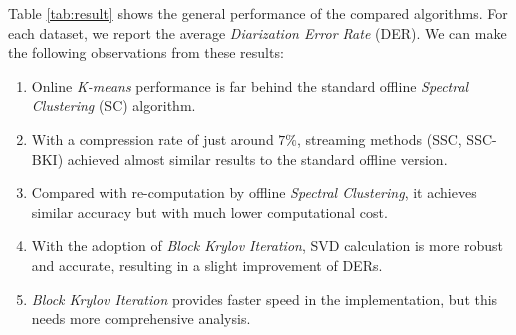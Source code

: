 Table \ref{tab:result} shows the general performance of the compared algorithms. For each dataset, we report the average \textit{Diarization Error Rate} (DER). We can make the following observations from these results:
\begin{enumerate}
    \item Online \textit{K-means} performance is far behind the standard offline \textit{Spectral Clustering} (SC) algorithm.
    \item With a compression rate of just around $7\%$, streaming methods (SSC, SSC-BKI) achieved almost similar results to the standard offline version.
    \item Compared with re-computation by offline \textit{Spectral Clustering}, it achieves similar accuracy but with much lower computational cost.
    \item With the adoption of \textit{Block Krylov Iteration}, SVD calculation is more robust and accurate, resulting in a slight improvement of DERs.
    \item \textit{Block Krylov Iteration} provides faster speed in the implementation, but this needs more comprehensive analysis.
\end{enumerate}





